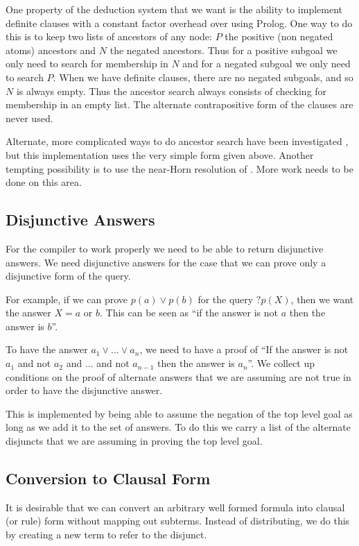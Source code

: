 One property of the deduction system that we want is the ability to
implement definite clauses with a constant factor overhead over
using Prolog. One way to do this is to keep two lists of ancestors
of any node: $P$ the positive (non negated atoms) ancestors
and $N$ the negated ancestors. Thus for a positive subgoal we
only need to search for membership in $N$ and for a negated subgoal we only
need to search $P$.
When we have definite clauses, there are no negated subgoals, and so 
$N$ is always empty. Thus the ancestor search always consists
of checking for membership in an empty list. The alternate
contrapositive form of the clauses are never used.

Alternate, more complicated ways to do ancestor search
have been investigated \cite{poole:grace}, but this implementation
uses the very simple form given above.
Another tempting possibility is to use the near-Horn resolution
of \cite{loveland87}. More work needs to be done on this area.
\subsection{Disjunctive Answers}
For the compiler to work properly we need to be able to return
disjunctive answers. We need disjunctive answers for the case
that we can prove only a disjunctive form of the query.

For example, if we can prove $p(a)\vee p(b)$ for the
query $?p(X)$, then we want the answer $X= a$ or $b$.
This can be seen as ``if the answer is not $a$ then the
answer is $b$''.

To have the answer $a_1\vee...\vee a_n$, we need to have a proof
of ``If the answer is not $a_1$ and not $a_2$ and ... and not $a_{n-1}$
then the answer is $a_n$''.
We collect up conditions on the proof of
alternate answers that we are assuming are not true in order to have
the disjunctive answer.

This is implemented by being able to assume the negation of the top level
goal as long as we add it to the set of answers. To do this we carry a list
of the alternate disjuncts that we are assuming in proving the top level goal.
\subsection{Conversion to Clausal Form}
It is desirable that we can convert an
arbitrary well formed formula into clausal (or rule) form
without mapping out subterms. Instead of distributing, we do this by
creating a new term to refer to the disjunct.

